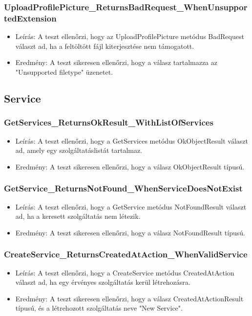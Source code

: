 \documentclass[11pt]{article}
\begin{document}
\subsubsection{UploadProfilePicture\_ReturnsBadRequest\_WhenUnsupportedExtension}
\label{sec:org55e32fb}
\begin{itemize}
\item Leírás: A teszt ellenőrzi, hogy az UploadProfilePicture metódus BadRequest választ ad, ha a feltöltött fájl kiterjesztése nem támogatott.
\item Eredmény: A teszt sikeresen ellenőrzi, hogy a válasz tartalmazza az "Unsupported filetype" üzenetet.
\end{itemize}
\subsection{Service}
\label{sec:org563012d}
\subsubsection{GetServices\_ReturnsOkResult\_WithListOfServices}
\label{sec:org4f51dab}
\begin{itemize}
\item Leírás: A teszt ellenőrzi, hogy a GetServices metódus OkObjectResult választ ad, amely egy szolgáltatáslistát tartalmaz.
\item Eredmény: A teszt sikeresen ellenőrzi, hogy a válasz OkObjectResult típusú.
\end{itemize}
\subsubsection{GetService\_ReturnsNotFound\_WhenServiceDoesNotExist}
\label{sec:orgcafb360}
\begin{itemize}
\item Leírás: A teszt ellenőrzi, hogy a GetService metódus NotFoundResult választ ad, ha a keresett szolgáltatás nem létezik.
\item Eredmény: A teszt sikeresen ellenőrzi, hogy a válasz NotFoundResult típusú.
\end{itemize}
\subsubsection{CreateService\_ReturnsCreatedAtAction\_WhenValidService}
\label{sec:org5808683}
\begin{itemize}
\item Leírás: A teszt ellenőrzi, hogy a CreateService metódus CreatedAtAction választ ad, ha egy érvényes szolgáltatás kerül létrehozásra.
\item Eredmény: A teszt sikeresen ellenőrzi, hogy a válasz CreatedAtActionResult típusú, és a létrehozott szolgáltatás neve "New Service".
\end{itemize}
\end{document}

